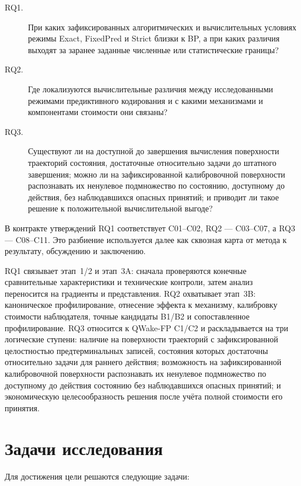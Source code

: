 \begin{description}
  \item[RQ1.] При каких зафиксированных алгоритмических и вычислительных
  условиях режимы Exact, FixedPred и Strict близки к BP, а при каких различия
  выходят за заранее заданные численные или статистические границы?

  \item[RQ2.] Где локализуются вычислительные различия между исследованными
  режимами предиктивного кодирования и с какими механизмами и компонентами
  стоимости они связаны?

  \item[RQ3.] Существуют ли на доступной до завершения вычисления поверхности
  траекторий состояния, достаточные относительно задачи до штатного завершения;
  можно ли на зафиксированной калибровочной поверхности распознавать их
  ненулевое подмножество по состоянию, доступному до действия, без наблюдавшихся
  опасных принятий; и приводит ли такое решение к положительной вычислительной
  выгоде?
\end{description}

В контракте утверждений RQ1 соответствует C01--C02, RQ2 --- C03--C07, а
RQ3 --- C08--C11. Это разбиение используется далее как сквозная карта от
метода к результату, обсуждению и заключению.

RQ1 связывает этап~1/2 и этап~3A: сначала проверяются конечные сравнительные
характеристики и технические контроли, затем анализ переносится на градиенты и
представления. RQ2 охватывает этап~3B: каноническое профилирование, отнесение
эффекта к механизму, калибровку стоимости наблюдателя, точные кандидаты B1/B2 и
сопоставленное профилирование. RQ3 относится к QWake-FP C1/C2 и раскладывается на
три логические ступени: наличие на поверхности траекторий с зафиксированной
целостностью предтерминальных записей, состояния которых достаточны относительно
задачи для раннего действия; возможность на зафиксированной калибровочной
поверхности распознавать их
ненулевое подмножество по доступному до действия состоянию без наблюдавшихся
опасных принятий; и экономическую целесообразность решения после учёта полной
стоимости его принятия.

\section{Задачи исследования}

Для достижения цели решаются следующие задачи:

